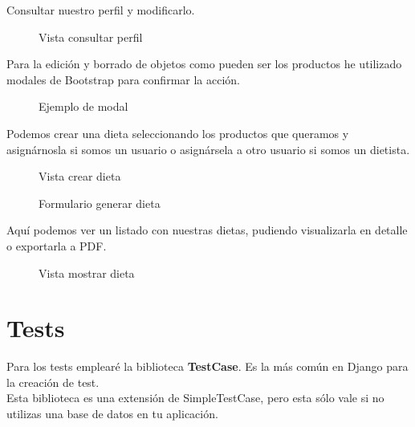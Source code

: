 Consultar nuestro perfil y modificarlo.

\begin{figure}[H]
  \centering
  \noindent{}
  \caption{Vista consultar perfil}
\end{figure}

Para la edición y borrado de objetos como pueden ser los productos he utilizado modales de Bootstrap para confirmar la acción.

\begin{figure}[H]
  \centering
  \noindent{}
  \caption{Ejemplo de modal}
\end{figure}

Podemos crear una dieta seleccionando los productos que queramos y asignárnosla si somos un usuario o asignársela a otro usuario si somos un dietista.

\begin{figure}[H]
  \centering
  \noindent{}
  \caption{Vista crear dieta}
\end{figure}

\begin{figure}[H]
  \centering
  \noindent{}
  \caption{Formulario generar dieta}
\end{figure}

Aquí podemos ver un listado con nuestras dietas, pudiendo visualizarla en detalle o exportarla a PDF.

\begin{figure}[H]
  \centering
  \noindent{}
  \caption{Vista mostrar dieta}
\end{figure}


\newpage
\section{Tests} \label{sec:tests}

Para los tests emplearé la biblioteca \textbf{TestCase}. Es la más común en Django para la creación de test.\\
Esta biblioteca es una extensión de SimpleTestCase, pero esta sólo vale si no utilizas una base de datos 
en tu aplicación.\\

